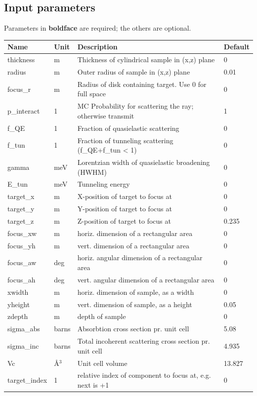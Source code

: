\subsection*{Input parameters}
Parameters in \textbf{boldface} are required; the others are optional.

\begin{longtable}{p{}p{}p{}p{}}
\toprule
\textbf{Name} & \textbf{Unit} & \textbf{Description} & \textbf{Default} \\
\midrule
\endhead
thickness & m & Thickness of cylindrical sample in (x,z) plane & 0 \\
radius & m & Outer radius of sample in (x,z) plane & 0.01 \\
focus\_r & m & Radius of disk containing target. Use 0 for full space & 0 \\
p\_interact & 1 & MC Probability for scattering the ray; otherwise transmit & 1 \\
f\_QE & 1 & Fraction of quasielastic scattering & 0 \\
f\_tun & 1 & Fraction of tunneling scattering (f\_QE+f\_tun \textless{} 1) & 0 \\
gamma & meV & Lorentzian width of quasielastic broadening (HWHM) & 0 \\
E\_tun & meV & Tunneling energy & 0 \\
target\_x & m & X-position of target to focus at & 0 \\
target\_y & m & Y-position of target to focus at & 0 \\
target\_z & m & Z-position of target to focus at & 0.235 \\
focus\_xw & m & horiz. dimension of a rectangular area & 0 \\
focus\_yh & m & vert.  dimension of a rectangular area & 0 \\
focus\_aw & deg & horiz. angular dimension of a rectangular area & 0 \\
focus\_ah & deg & vert.  angular dimension of a rectangular area & 0 \\
xwidth & m & horiz. dimension of sample, as a width & 0 \\
yheight & m & vert.  dimension of sample, as a height & 0.05 \\
zdepth & m & depth of sample & 0 \\
sigma\_abs & barns & Absorbtion cross section pr. unit cell & 5.08 \\
sigma\_inc & barns & Total incoherent scattering cross section pr. unit cell & 4.935 \\
Vc & \AA{}$^{3}$ & Unit cell volume & 13.827 \\
target\_index & 1 & relative index of component to focus at, e.g. next is +1 & 0 \\
\bottomrule
\end{longtable}

